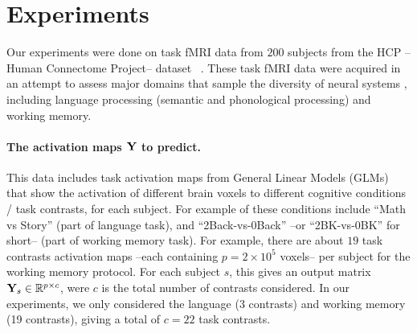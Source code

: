 
\section{Experiments}
\label{sec:exp}
Our experiments were done on task fMRI data from
$200$ subjects from the HCP --Human Connectome Project-- dataset
 ~\citep{VanEssen20122222}. These task fMRI data were acquired in an
 attempt to assess major
 domains that sample the diversity of neural systems , including
 language processing (semantic and phonological
processing) and working memory.
\paragraph{The activation maps $\mathbf{Y}$ to predict.}
This data includes task activation
maps from General Linear Models (GLMs)  \citep{friston1994statistical} that show the activation
of different brain voxels to different cognitive conditions / task contrasts, for each subject.
For example of these conditions include ``Math vs Story'' (part of language task),
and ``2Back-vs-0Back'' --or ``2BK-vs-0BK'' for short-- (part of working memory task).
For example, there are about $19$ task contrasts activation maps
--each containing $p = 2 \times 10^5$ voxels-- per subject for the
working memory protocol. For each subject $s$, this gives an output matrix
$\mathbf{Y}_s \in \mathbb R^{p \times c}$, were $c$ is the total number of contrasts considered.
In our experiments, we only considered the language (3 contrasts) and working memory
(19 contrasts), giving a total of $c=22$ task contrasts.\\

